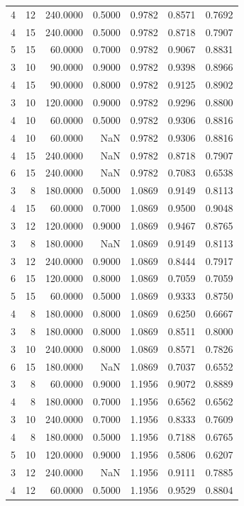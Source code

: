 \begin{tabular}{rrrrrrr}
4 & 12 & 240.0000 & 0.5000 & 0.9782 & 0.8571 & 0.7692 \\
4 & 15 & 240.0000 & 0.5000 & 0.9782 & 0.8718 & 0.7907 \\
5 & 15 & 60.0000 & 0.7000 & 0.9782 & 0.9067 & 0.8831 \\
3 & 10 & 90.0000 & 0.9000 & 0.9782 & 0.9398 & 0.8966 \\
4 & 15 & 90.0000 & 0.8000 & 0.9782 & 0.9125 & 0.8902 \\
3 & 10 & 120.0000 & 0.9000 & 0.9782 & 0.9296 & 0.8800 \\
4 & 10 & 60.0000 & 0.5000 & 0.9782 & 0.9306 & 0.8816 \\
4 & 10 & 60.0000 & NaN & 0.9782 & 0.9306 & 0.8816 \\
4 & 15 & 240.0000 & NaN & 0.9782 & 0.8718 & 0.7907 \\
6 & 15 & 240.0000 & NaN & 0.9782 & 0.7083 & 0.6538 \\
3 & 8 & 180.0000 & 0.5000 & 1.0869 & 0.9149 & 0.8113 \\
4 & 15 & 60.0000 & 0.7000 & 1.0869 & 0.9500 & 0.9048 \\
3 & 12 & 120.0000 & 0.9000 & 1.0869 & 0.9467 & 0.8765 \\
3 & 8 & 180.0000 & NaN & 1.0869 & 0.9149 & 0.8113 \\
3 & 12 & 240.0000 & 0.9000 & 1.0869 & 0.8444 & 0.7917 \\
6 & 15 & 120.0000 & 0.8000 & 1.0869 & 0.7059 & 0.7059 \\
5 & 15 & 60.0000 & 0.5000 & 1.0869 & 0.9333 & 0.8750 \\
4 & 8 & 180.0000 & 0.8000 & 1.0869 & 0.6250 & 0.6667 \\
3 & 8 & 180.0000 & 0.8000 & 1.0869 & 0.8511 & 0.8000 \\
3 & 10 & 240.0000 & 0.8000 & 1.0869 & 0.8571 & 0.7826 \\
6 & 15 & 180.0000 & NaN & 1.0869 & 0.7037 & 0.6552 \\
3 & 8 & 60.0000 & 0.9000 & 1.1956 & 0.9072 & 0.8889 \\
4 & 8 & 180.0000 & 0.7000 & 1.1956 & 0.6562 & 0.6562 \\
3 & 10 & 240.0000 & 0.7000 & 1.1956 & 0.8333 & 0.7609 \\
4 & 8 & 180.0000 & 0.5000 & 1.1956 & 0.7188 & 0.6765 \\
5 & 10 & 120.0000 & 0.9000 & 1.1956 & 0.5806 & 0.6207 \\
3 & 12 & 240.0000 & NaN & 1.1956 & 0.9111 & 0.7885 \\
4 & 12 & 60.0000 & 0.5000 & 1.1956 & 0.9529 & 0.8804 \\

\end{tabular}
